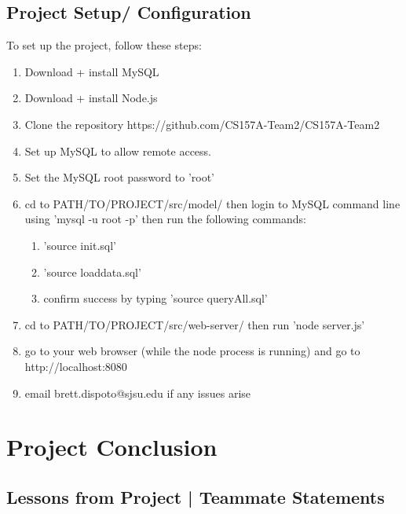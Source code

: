 \documentclass[letter, 12pt, titlepage]{article}
\begin{document}
\subsection{Project Setup/ Configuration}
	To set up the project, follow these steps:
	\begin{enumerate}
		\item Download + install MySQL
		\item Download + install Node.js
		\item Clone the repository https://github.com/CS157A-Team2/CS157A-Team2
		\item Set up MySQL to allow remote access.
		\item Set the MySQL root password to 'root'
		\item cd to PATH/TO/PROJECT/src/model/ then login to MySQL command line using 'mysql -u root -p' then run the following commands:
				\begin{enumerate}
					\item 'source init.sql'
					\item 'source loaddata.sql'
					\item confirm success by typing 'source queryAll.sql'
				\end{enumerate}
		\item cd to  PATH/TO/PROJECT/src/web-server/ then run 'node server.js'
		\item go to your web browser (while the node process is running) and go to http://localhost:8080
		\item email brett.dispoto@sjsu.edu if any issues arise
	\end{enumerate}

\section{Project Conclusion}

\subsection{Lessons from Project | Teammate Statements}
\end{document}
